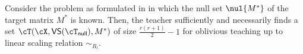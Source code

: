 
\begin{lemma}\label{lemma: orthoset}
    Consider the problem as formulated in  in which the null set $\nul{M^*}$ of the target matrix $M^*$ is known. Then, the teacher sufficiently and necessarily finds a set $\cT(\cX,\textsf{VS}(\cT_{\sf{null}}),M^*)$ of size $\frac{r(r+1)}{2} - 1$ for oblivious teaching up to linear scaling relation $\sim_{R_l}$.
\end{lemma}
